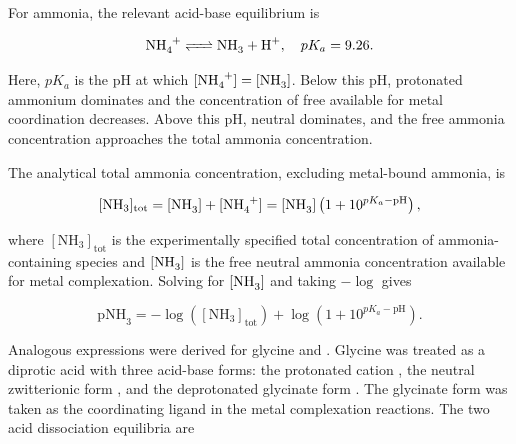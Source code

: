 \documentclass[twoside,twocolumn,9pt]{article}
\begin{document}

For ammonia, the relevant acid-base equilibrium is

\begin{equation} \label{eq:NH4_equilibrium}
    \ce{NH4+ <=> NH3 + H+}, \quad pK_a = 9.26 .
\end{equation}

Here, \(pK_a\) is the pH at which \([\ce{NH4+}] = [\ce{NH3}]\). Below this pH, protonated ammonium dominates and the concentration of free  available for metal coordination decreases. Above this pH, neutral  dominates, and the free ammonia concentration approaches the total ammonia concentration.

The analytical total ammonia concentration, excluding metal-bound ammonia, is

\begin{equation} \label{eq:NH3_massbalance}
    [\mathrm{NH}_3]_{\mathrm{tot}} 
    = [\ce{NH3}] + [\ce{NH4+}] 
    = [\ce{NH3}]\left(1 + 10^{pK_a - \mathrm{pH}}\right),
\end{equation}

where \([\mathrm{NH}_3]_{\mathrm{tot}}\) is the experimentally specified total concentration of ammonia-containing species and \([\ce{NH3}]\) is the free neutral ammonia concentration available for metal complexation. Solving for \([\ce{NH3}]\) and taking \(-\log\) gives

\begin{equation} \label{eq:pNH3}
    \mathrm{pNH}_3 
    = -\log\left([\mathrm{NH}_3]_{\mathrm{tot}}\right) 
    + \log\left(1 + 10^{pK_a - \mathrm{pH}}\right).
\end{equation}

Analogous expressions were derived for glycine and . Glycine was treated as a diprotic acid with three acid-base forms: the protonated cation , the neutral zwitterionic form , and the deprotonated glycinate form . The glycinate form was taken as the coordinating ligand in the metal complexation reactions. The two acid dissociation equilibria are
\end{document}
